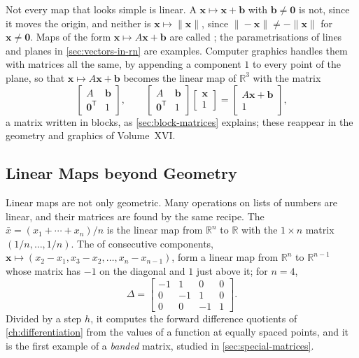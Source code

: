 Not every map that looks simple is linear. A  $\mathbf x\mapsto\mathbf x+\mathbf b$ with $\mathbf b\ne\mathbf 0$ is not, since it moves the origin, and neither is $\mathbf x\mapsto\|\mathbf x\|$, since $\|-\mathbf x\|\ne-\|\mathbf x\|$ for $\mathbf x\ne\mathbf 0$. Maps of the form $\mathbf x\mapsto A\mathbf x+\mathbf b$ are called ; the parametrisations of lines and planes in \cref{sec:vectors-in-rn} are examples. Computer graphics handles them with matrices all the same, by appending a component $1$ to every point of the plane, so that $\mathbf x\mapsto A\mathbf x+\mathbf b$ becomes the linear map of $\mathbb R^3$ with the matrix
\[
\begin{bmatrix}A&\mathbf b\\\mathbf 0^{\mathsf T}&1\end{bmatrix},\qquad\begin{bmatrix}A&\mathbf b\\\mathbf 0^{\mathsf T}&1\end{bmatrix}\begin{bmatrix}\mathbf x\\1\end{bmatrix}=\begin{bmatrix}A\mathbf x+\mathbf b\\1\end{bmatrix},
\]
a matrix written in blocks, as \cref{sec:block-matrices} explains; these  reappear in the geometry and graphics of Volume~XVI.

\subsection{Linear Maps beyond Geometry}

Linear maps are not only geometric. Many operations on lists of numbers are linear, and their matrices are found by the same recipe. The  $\bar x=(x_1+\cdots+x_n)/n$ is the linear map from $\mathbb R^n$ to $\mathbb R$ with the $1\times n$ matrix $(1/n,\ldots,1/n)$. The  of consecutive components, $\mathbf x\mapsto(x_2-x_1,x_3-x_2,\ldots,x_n-x_{n-1})$, form a linear map from $\mathbb R^n$ to $\mathbb R^{n-1}$ whose matrix has $-1$ on the diagonal and $1$ just above it; for $n=4$,
\[
\Delta=\begin{bmatrix}-1&1&0&0\\0&-1&1&0\\0&0&-1&1\end{bmatrix}.
\]
Divided by a step $h$, it computes the forward difference quotients of \cref{ch:differentiation} from the values of a function at equally spaced points, and it is the first example of a \emph{banded} matrix, studied in \cref{sec:special-matrices}.

